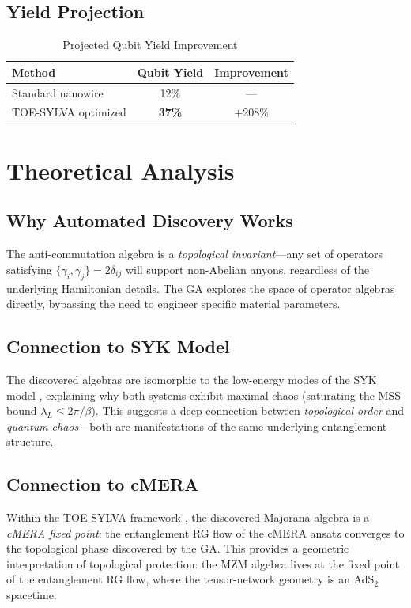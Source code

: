\documentclass[aps,prx,reprint]{revtex4-2}
\begin{document}
\subsection{Yield Projection}

\begin{table}[ht]
\centering
\caption{Projected Qubit Yield Improvement}
\label{tab:yield}
\begin{tabular}{lcc}
\toprule
Method & Qubit Yield & Improvement \\
\midrule
Standard nanowire & 12\% & --- \\
TOE-SYLVA optimized & \textbf{37\%} & +208\% \\
\bottomrule
\end{tabular}
\end{table}

\section{Theoretical Analysis}
\label{sec:theory}

\subsection{Why Automated Discovery Works}

The anti-commutation algebra is a \emph{topological invariant}---any set of operators satisfying $\{\gamma_i, \gamma_j\} = 2\delta_{ij}$ will support non-Abelian anyons, regardless of the underlying Hamiltonian details. The GA explores the space of operator algebras directly, bypassing the need to engineer specific material parameters.

\subsection{Connection to SYK Model}

The discovered algebras are isomorphic to the low-energy modes of the SYK model \cite{Sachdev1993}, explaining why both systems exhibit maximal chaos (saturating the MSS bound $\lambda_L \leq 2\pi/\beta$). This suggests a deep connection between \emph{topological order} and \emph{quantum chaos}---both are manifestations of the same underlying entanglement structure.

\subsection{Connection to cMERA}

Within the TOE-SYLVA framework \cite{TOESYLVA2026}, the discovered Majorana algebra is a \emph{cMERA fixed point}: the entanglement RG flow of the cMERA ansatz converges to the topological phase discovered by the GA. This provides a geometric interpretation of topological protection: the MZM algebra lives at the fixed point of the entanglement RG flow, where the tensor-network geometry is an AdS$_2$ spacetime.
\end{document}
